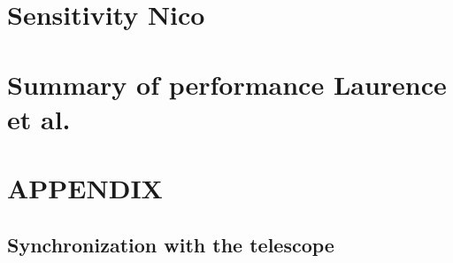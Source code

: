 \documentclass[a4paper, 11pt]{report}
\begin{document}
\clearpage
%


\clearpage
\chapter{Sensitivity {\color{YellowGreen} Nico}}
\label{se:nefd}
%

%
%



\clearpage
\chapter{Summary of performance {\color{blue} Laurence et al.}}
\label{se:summary}



\clearpage
\appendix

\chapter{APPENDIX}

  \section{Synchronization with the telescope}
  \label{ap:synchro}
  
  
\end{document}
